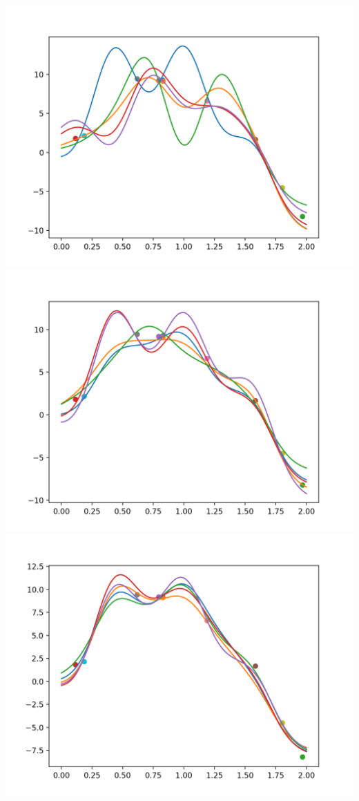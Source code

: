 \documentclass{article}
\begin{document}
\includegraphics[width=\textwidth]{sample10_5sample.png}\\
\includegraphics[width=\textwidth]{sample15_sample5.png}\\
\includegraphics[width=\textwidth]{sample30_sample5.png}\\
\end{document}

